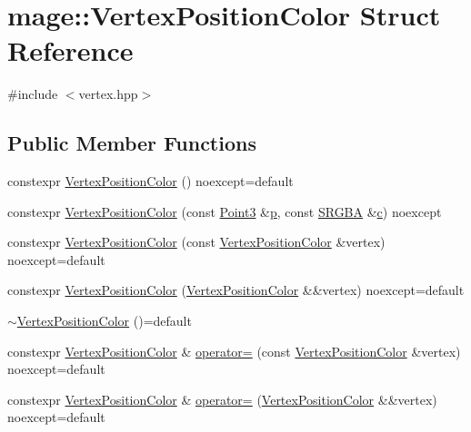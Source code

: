 \hypertarget{structmage_1_1_vertex_position_color}{}\section{mage\+:\+:Vertex\+Position\+Color Struct Reference}
\label{structmage_1_1_vertex_position_color}


{\ttfamily \#include $<$vertex.\+hpp$>$}

\subsection*{Public Member Functions}
\begin{DoxyCompactItemize}
\item 
constexpr \hyperlink{structmage_1_1_vertex_position_color_a1d9bbf97086b3006e9fdf5e70f75d4c7}{Vertex\+Position\+Color} () noexcept=default
\item 
constexpr \hyperlink{structmage_1_1_vertex_position_color_a6ef8663606fb054b70c46557a7fe281b}{Vertex\+Position\+Color} (const \hyperlink{structmage_1_1_point3}{Point3} \&\hyperlink{structmage_1_1_vertex_position_color_afe40a78afb8e13e742d93d5092b1a614}{p}, const \hyperlink{structmage_1_1_s_r_g_b_a}{S\+R\+G\+BA} \&\hyperlink{structmage_1_1_vertex_position_color_a18b969637a84ba42f99fd2c54cfc779a}{c}) noexcept
\item 
constexpr \hyperlink{structmage_1_1_vertex_position_color_a6eb765ab99973819d86359dcbba9e856}{Vertex\+Position\+Color} (const \hyperlink{structmage_1_1_vertex_position_color}{Vertex\+Position\+Color} \&vertex) noexcept=default
\item 
constexpr \hyperlink{structmage_1_1_vertex_position_color_ac2ab05829423e41f638f5a93cc236fed}{Vertex\+Position\+Color} (\hyperlink{structmage_1_1_vertex_position_color}{Vertex\+Position\+Color} \&\&vertex) noexcept=default
\item 
\hyperlink{structmage_1_1_vertex_position_color_a18c4400389dfd47482a7d0901d904aec}{$\sim$\+Vertex\+Position\+Color} ()=default
\item 
constexpr \hyperlink{structmage_1_1_vertex_position_color}{Vertex\+Position\+Color} \& \hyperlink{structmage_1_1_vertex_position_color_a76e9a602b85191a4651610fb8f99a541}{operator=} (const \hyperlink{structmage_1_1_vertex_position_color}{Vertex\+Position\+Color} \&vertex) noexcept=default
\item 
constexpr \hyperlink{structmage_1_1_vertex_position_color}{Vertex\+Position\+Color} \& \hyperlink{structmage_1_1_vertex_position_color_a02ad0c89f38799200a0b475a45fbbcd6}{operator=} (\hyperlink{structmage_1_1_vertex_position_color}{Vertex\+Position\+Color} \&\&vertex) noexcept=default
\end{DoxyCompactItemize}

